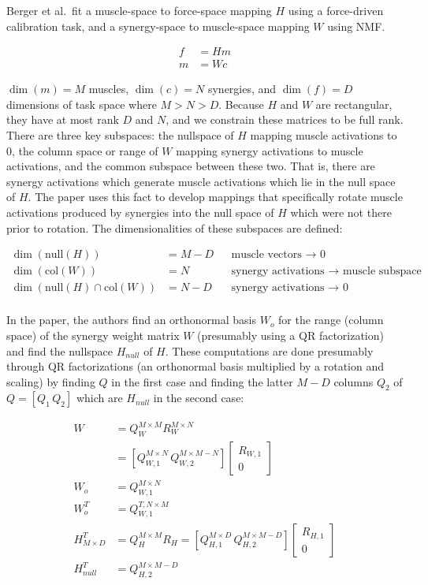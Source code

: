 \documentclass[../main.tex]{subfiles}
\begin{document}
Berger et al.~fit a muscle-space to force-space mapping \(H\) using a force-driven calibration task, and a synergy-space to muscle-space mapping \(W\) using NMF.

\begin{align*}
    f &= Hm \\
    m &= Wc
\end{align*}

\(\dim(m)=M\) muscles, \(\dim(c)=N\) synergies, and \(\dim(f)=D\) dimensions of task space where \(M>N>D\). Because \(H\) and \(W\) are rectangular, they have at most rank \(D\) and \(N\), and we constrain these matrices to be full rank. There are three key subspaces: the nullspace of \(H\) mapping muscle activations to 0, the column space or range of \(W\) mapping synergy activations to muscle activations, and the common subspace between these two. That is, there are synergy activations which generate muscle activations which lie in the null space of \(H\). The paper uses this fact to develop mappings that specifically rotate muscle activations produced by synergies into the null space of \(H\) which were not there prior to rotation. The dimensionalities of these subspaces are defined:

\begin{align*}
\dim(\mathrm{null}(H)) &= M - D && \text{muscle vectors $\rightarrow$ 0} \\
\dim(\mathrm{col}(W)) &= N && \text{synergy activations $\rightarrow$ muscle subspace}\\
\dim(\mathrm{null}(H)\cap\mathrm{col}(W)) &= N - D && \text{synergy activations $\rightarrow$ 0} \\
\end{align*}

In the paper, the authors find an orthonormal basis \(W_o\) for the range (column space) of the synergy weight matrix \(W\) (presumably using a QR factorization) and find the nullspace \(H_{null}\) of \(H\). These computations are done presumably through QR factorizations (an orthonormal basis multiplied by a rotation and scaling) by finding \(Q\) in the first case and finding the latter \(M-D\) columns \(Q_2\) of \(Q = [Q_1 \, Q_2]\) which are \(H_{null}\) in the second case:

\begin{align*}
    W &= Q_W^{M\times M}R_W^{M\times N} \\
      &= \left[Q_{W,1}^{M\times N}\,Q_{W,2}^{M\times M-N}\right]\begin{bmatrix}R_{W,1} \\ 0 \end{bmatrix} \\
    W_o &= Q_{W,1}^{M\times N} \\
    W_o^T &= Q_{W,1}^{T, N\times M} \\
    H^T_{M\times D} &= Q_H^{M\times M}R_H = \left[Q_{H,1}^{M\times D}\,Q_{H,2}^{M\times M-D}\right]\begin{bmatrix}R_{H,1} \\ 0 \end{bmatrix} \\
    H^T_{null} &= Q_{H,2}^{M\times M-D}
\end{align*}
\end{document}
